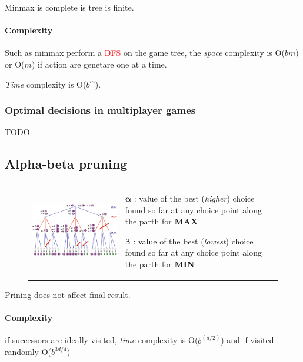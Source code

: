 Minmax is complete is tree is finite.

\paragraph{Complexity} 
Such as minmax perform a \textcolor{red}{DFS} on the game tree, the \textit{space} complexity is O($bm$) 
or O($m$) if action are genetare one at a time.

\textit{Time} complexity is O($b^m$).

\subsubsection{Optimal decisions in multiplayer games}
TODO

\subsection{Alpha-beta pruning}
\begin{figure}[h]
\begin{tabular}{m{10cm}m{6cm}}
    \centering
    \includegraphics[width=10cm]{minmax_ex.png}
&

\begin{description}
    \item $\mathbf{\alpha}$ : value of the best (\textit{higher}) choice found
        so far at any choice point along the parth for \textbf{MAX}
    \item $\mathbf{\beta}$ : value of the best (\textit{lowest}) choice found
    so far at any choice point along the parth for \textbf{MIN}
\end{description}
\end{tabular}
\end{figure}

Prining does not affect final result.

\paragraph{Complexity} if successors are ideally visited, \textit{time} complexity
is O($b^{(d/2)}$) and if visited randomly O($b^{3d/4}$)


